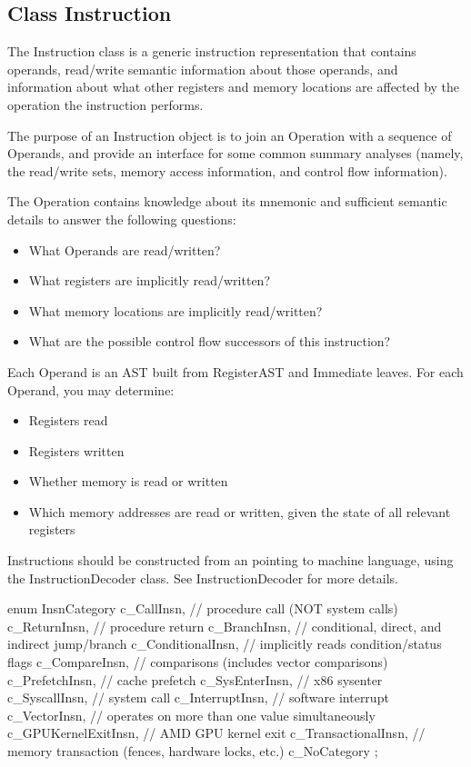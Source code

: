 \subsection{Class Instruction}
\label{sec:instruction}


The Instruction class is a generic instruction representation that contains
operands, read/write semantic information about those operands, and information
about what other registers and memory locations are affected by the operation
the instruction performs.

The purpose of an Instruction object is to join an Operation with a sequence of
Operands, and provide an interface for some common summary analyses (namely, the
read/write sets, memory access information, and control flow information).

The Operation contains knowledge about its mnemonic and sufficient semantic
details to answer the following questions:
\begin{itemize}
\item What Operands are read/written?
\item What registers are implicitly read/written?
\item What memory locations are implicitly read/written?
\item What are the possible control flow successors of this instruction?
\end{itemize}

Each Operand is an AST built from RegisterAST and Immediate leaves. For each Operand, you may determine:
\begin{itemize}
\item Registers read
\item Registers written
\item Whether memory is read or written
\item Which memory addresses are read or written, given the state of all relevant registers
\end{itemize}

Instructions should be constructed from an  
pointing to machine language, using the InstructionDecoder class.  See
InstructionDecoder for more details.

\begin{apient}
enum InsnCategory {
  c_CallInsn,          // procedure call (NOT system calls)
  c_ReturnInsn,        // procedure return
  c_BranchInsn,        // conditional, direct, and indirect jump/branch
  c_ConditionalInsn,   // implicitly reads condition/status flags
  c_CompareInsn,       // comparisons (includes vector comparisons)
  c_PrefetchInsn,      // cache prefetch
  c_SysEnterInsn,      // x86 sysenter
  c_SyscallInsn,       // system call
  c_InterruptInsn,     // software interrupt
  c_VectorInsn,        // operates on more than one value simultaneously
  c_GPUKernelExitInsn, // AMD GPU kernel exit
  c_TransactionalInsn, // memory transaction (fences, hardware locks, etc.)
  c_NoCategory
};
\end{apient}

